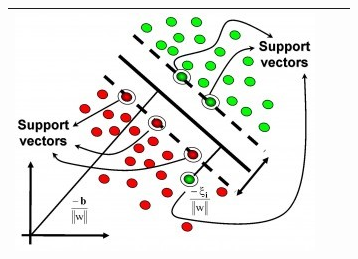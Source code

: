 \begin{longtable}[]{ccc}
\begin{minipage}{0.1\linewidth}
  \includegraphics[width=1.0\linewidth]{./img/ch2/sec1/6.jpg}  
\end{minipage}
\tabularnewline
\bottomrule
\end{longtable}

